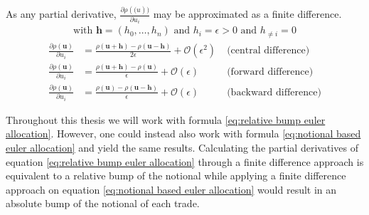 \documentclass[../Thesis_AHoecherl.tex]{subfiles}
\begin{document}
As any partial derivative, $\frac{\partial \rho(\mathbf(u))}{\partial u_i}$ may be approximated as a finite difference.
\begin{gather*}
    \text{with }\mathbf{h}=(h_0,\dots,h_n) \text{ and } h_i = \epsilon > 0 \text{ and } h_{\neq i}=0
\end{gather*}
\begin{align}
    \label{eq:central difference}
    \frac{\partial \rho(\mathbf{u})}{\partial u_i} &= \frac{\rho(\mathbf{u}+\mathbf{h})-\rho(\mathbf{u}-\mathbf{h})}{2\epsilon} + \mathcal{O}(\epsilon^2) \; &\text{(central difference)} \\
    \label{eq:forward difference}
    \frac{\partial \rho(\mathbf{u})}{\partial u_i} &= \frac{\rho(\mathbf{u}+\mathbf{h})-\rho(\mathbf{u})}{\epsilon} + \mathcal{O}(\epsilon) &\text{(forward difference)}\\ 
    \label{eq:backward difference}
    \frac{\partial \rho(\mathbf{u})}{\partial u_i} &= \frac{\rho(\mathbf{u})-\rho(\mathbf{u}-\mathbf{h})}{\epsilon} + \mathcal{O}(\epsilon) &\text{(backward difference)}
\end{align}

Throughout this thesis we will work with formula \ref{eq:relative bump euler allocation}.
However, one could instead also work with formula \ref{eq:notional based euler allocation} and yield the same results.
Calculating the partial derivatives of equation \ref{eq:relative bump euler allocation} through a finite difference approach is equivalent to a relative bump of the notional while applying a finite difference approach on equation \ref{eq:notional based euler allocation} would result in an absolute bump of the notional of each trade. 
\end{document}
